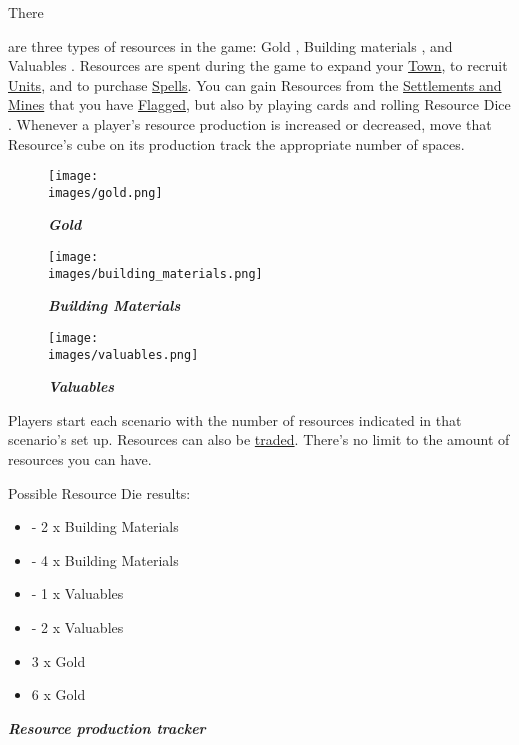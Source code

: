 \hypertarget{Resources}{There} are three types of resources in the game: Gold , Building materials , and Valuables .
Resources are spent during the game to expand your \hyperlink{Town}{Town}, to recruit \hyperlink{Units}{Units}, and to purchase \hyperlink{spells}{Spells}.
You can gain Resources from the \hyperlink{Mines}{Settlements and Mines} that you have \hyperlink{Categories}{Flagged}, but also by playing cards and rolling Resource Dice .
Whenever a player's resource production is increased or decreased, move that Resource's cube on its production track the appropriate number of spaces.\par
\begin{figure}[h]
  \centering
    \centering
    \texttt{[image: \\images/gold.png]}
    \caption{{\textit{\textbf{\textcolor{darkcandyapplered}{Gold}}}}}
  \endminipage
    \centering
    \texttt{[image: \\images/building\_materials.png]}
    \caption{{\textit{\textbf{{\textcolor{darkcandyapplered}{Building Materials}}}}}}
  \endminipage
    \centering
    \texttt{[image: \\images/valuables.png]}
    \caption{{\textit{\textbf{{\textcolor{darkcandyapplered}{Valuables}}}}}}
  \endminipage
\end{figure}
Players start each scenario with the number of resources indicated in that scenario’s set up.
Resources can also be \hyperlink{Trading}{traded}.
There's no limit to the amount of resources you can have.\bigbreak

\begin{minipage}[T]{0.38\textwidth}
    Possible Resource Die  results:\bigbreak
    \begin{itemize}
        \setlength\itemsep{10pt}
        \item  - 2 x Building Materials
        \item  - 4 x Building Materials
        \item  - 1 x Valuables
        \item  - 2 x Valuables
        \item  3 x Gold
        \item  6 x Gold
    \end{itemize}
\end{minipage}
\begin{minipage}[t]{0.48\textwidth}
    \break
    \centering
    \footnotesize{\textbf{\textit{\textcolor{darkcandyapplered}{Resource production tracker}}}}
\end{minipage}\hfill
